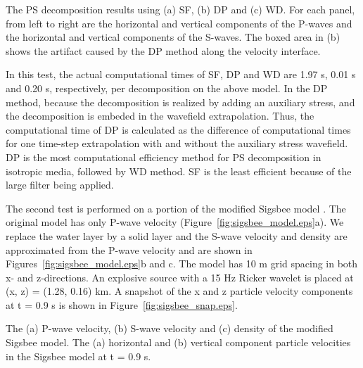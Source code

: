 \documentclass[manuscript,ulem,graphix,revised]{geophysics}
\begin{document}
{
The PS decomposition results using (a) SF, (b) DP and (c) WD. For each panel, from left to right are the horizontal and vertical components of the P-waves and the horizontal and vertical components of the S-waves. The boxed area in (b) shows the artifact caused by the DP method along the velocity interface.
}

In this test, the actual computational times of SF, DP and WD are 1.97 s, 0.01 s and 0.20 s, respectively, per decomposition on the above model. In the DP method, because the decomposition is realized by adding an auxiliary stress, and the decomposition is embeded in the wavefield extrapolation. Thus, the computational time of DP is calculated as the difference of computational times for one time-step extrapolation with and without the auxiliary stress wavefield. DP is the most computational efficiency method for PS decomposition in isotropic media, followed by WD method. SF is the least efficient because of the large filter being applied.

The second test is performed on a portion of the modified Sigsbee model \citep{paffenholz02}. The original model has only P-wave velocity (Figure~\ref{fig:sigsbee_model.eps}a). We replace the water layer by a solid layer and the S-wave velocity and density are approximated from the P-wave velocity and are shown in Figures~\ref{fig:sigsbee_model.eps}b and c.
The model has 10 m grid spacing in both x- and z-directions. An explosive source with a 15 Hz Ricker wavelet is placed at (x, z) = (1.28, 0.16) km. A snapshot of the x and z particle velocity components at t = 0.9 s is shown in Figure~\ref{fig:sigsbee_snap.eps}.

{
The (a) P-wave velocity, (b) S-wave velocity and (c) density of the modified Sigsbee model. 
}
{
The (a) horizontal and (b) vertical component particle velocities in the Sigsbee model at t = 0.9 s.
}
\end{document}
